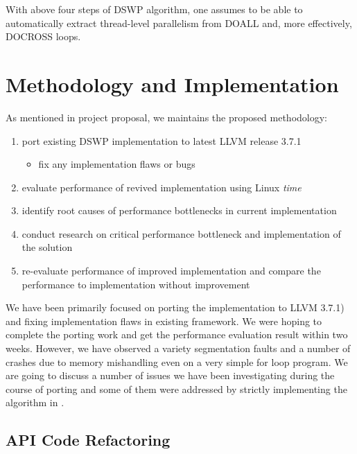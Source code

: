 \documentclass[letterpaper, 10 pt, conference]{ieeeconf}  %
\begin{document}
With above four steps of DSWP algorithm, one assumes to be able to automatically extract thread-level parallelism from DOALL and, more effectively, DOCROSS loops. 

\section{Methodology and Implementation}
As mentioned in project proposal, we maintains the proposed methodology:
\begin{enumerate}
\item port existing DSWP implementation to latest LLVM release 3.7.1
\begin{itemize}
\item fix any implementation flaws or bugs
\end{itemize}
\item evaluate performance of revived implementation using Linux \textit{time}
\item identify root causes of performance bottlenecks in current implementation
\item conduct research on critical performance bottleneck and implementation of the solution
\item re-evaluate performance of improved implementation and compare the performance to implementation without improvement
\end{enumerate}



We have been primarily focused on porting the implementation to LLVM 3.7.1) and fixing implementation flaws in existing framework. We were hoping to complete the porting work and get the performance evaluation result within two weeks. However, we have observed a variety segmentation faults and a number of crashes due to memory mishandling even on a very simple for loop program. We are going to discuss a number of issues we have been investigating during the course of porting and some of them were addressed by strictly implementing the algorithm in \cite{c3}.

\subsection{API Code Refactoring} 
\end{document}
